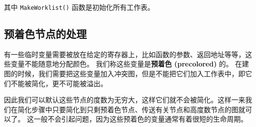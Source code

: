 其中 \texttt{MakeWorklist()} 函数是初始化所有工作表。

\subsection{预着色节点的处理}

有一些临时变量需要被放在给定的寄存器上，比如函数的参数、返回地址等等，这些变量不能随意地分配颜色。
我们称这些变量是\textbf{预着色 (precolored)} 的。
在建图的时候，我们需要把这些变量加入冲突图，但是不能把它们加入工作表中，即它们不能被简化，更不可能被溢出。

因此我们可以默认这些节点的度数为无穷大，这样它们就不会被简化。这样一来我们在简化步骤中只要简化到只剩预着色节点、传送有关节点和高度数节点的图就可以了。
这一般不会引起问题，因为这些预着色的变量通常有着很短的生命周期。
